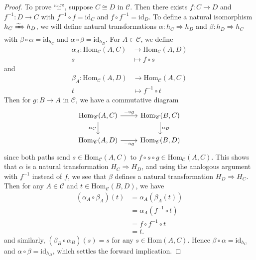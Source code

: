 \documentclass[10pt,oneside]{book}
\def\~#1{\mathscr{#1}}
\newcommand{\Hom}{\mathrm{Hom}}
\newcommand{\id}{\mathrm{id}}
\theoremstyle{plain}
\theoremstyle{definition}
\theoremstyle{remark}
\numberwithin{equation}{section}
\numberwithin{figure}{section}
\begin{document}
\begin{proof}
    To prove ``if'', suppose $C \cong D$ in $\~C$. Then there exists $f: C \to D$ and $f^{-1}:D \to C$ with $f^{-1} \circ f = \id_C$ and $f \circ f^{-1} = \id_D$. To define a natural isomorphism $h_C \xRightarrow{\sim} h_D$, we will define natural transformations $\alpha: h_C \Rightarrow h_D$ and $\beta: h_D \Rightarrow h_C$ with $\beta \circ \alpha = \id_{h_C}$ and $\alpha \circ \beta = \id_{h_D}$. For $A \in \~C$, we define 
    \begin{align*}
        \alpha_A: \Hom_{\~C}(A,C) &\to \Hom_{\~C}(A,D) \\ 
        s &\mapsto f \circ s
    \end{align*} 
    and
    \begin{align*}
        \beta_A: \Hom_{\~C}(A,D) &\to \Hom_{\~C}(A,C) \\ 
        t &\mapsto f^{-1} \circ t
    \end{align*}
    Then for $g: B \to A$ in $\~C$, we have a commutative diagram
    \[\begin{tikzcd}
        {\Hom_{\~C}(A,C)} & {\Hom_{\~C}(B, C)} \\
        {\Hom_{\~C}(A,D)} & {\Hom_{\~C}(B,D)}
        \arrow["{- \circ g}", from=1-1, to=1-2]
        \arrow["{\alpha_C}"', from=1-1, to=2-1]
        \arrow["{\alpha_D}", from=1-2, to=2-2]
        \arrow["{- \circ g}"', from=2-1, to=2-2]
    \end{tikzcd}\]
    since both paths send $s \in \Hom_{\~C}(A,C)$ to $f \circ s \circ g \in \Hom_{\~C}(A,C)$. This shows that $\alpha$ is a natural transformation $H_C \Rightarrow H_D$, and using the analogous argument with $f^{-1}$ instead of $f$, we see that $\beta$ defines a natural transformation $H_D \Rightarrow H_C$. Then for any $A \in \~C$ and $t \in \Hom_{\~C}(B, D)$, we have
    \begin{align*}
        (\alpha_A \circ \beta_A)(t) &= \alpha_A(\beta_A(t)) \\ &= \alpha_A (f^{-1} \circ t) \\ &= f \circ f^{-1} \circ t  \\ &= t.
    \end{align*}
    and similarly, $(\beta_B\circ \alpha_B)(s) = s$ for any $s \in \Hom(A, C)$. Hence $\beta \circ \alpha = \id_{h_C}$ and $\alpha \circ \beta = \id_{h_D}$, which settles the forward implication.


\end{proof}
\end{document}
